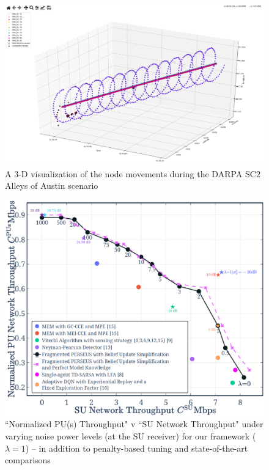 \documentclass{article}
\begin{document}
\begin{figure}
    \centering
    \includegraphics[width = 1.0\textwidth]{Alleys_GPS.PNG}
    \caption{A $3$-D visualization of the node movements during the DARPA SC$2$ Alleys of Austin scenario}
    \label{fig:3}
\end{figure}

\begin{figure}
    \centering
    \includegraphics[width = 1.0\textwidth]{Evaluation_2.png}
    \caption{``Normalized PU(s) Throughput" v ``SU Network Throughput" under varying noise power levels (at the SU receiver) for our framework ($\lambda{=}1$) -- in addition to penalty-based tuning and state-of-the-art comparisons}
    \label{fig:4}
\end{figure}
\end{document}
